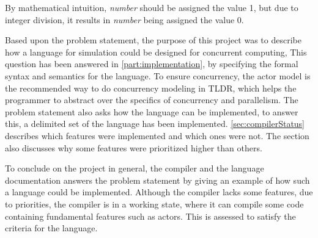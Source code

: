 By mathematical intuition, \emph{number} should be assigned the value 1, but due to integer division, it results in \emph{number} being assigned the value 0.

Based upon the problem statement, the purpose of this project was to describe how a language for simulation could be designed for concurrent computing, This question has been answered in \cref{part:implementation}, by specifying the formal syntax and semantics for the language.
To ensure concurrency, the actor model is the recommended way to do concurrency modeling in TLDR, which helps the programmer to abstract over the specifics of concurrency and parallelism.
The problem statement also asks how the language can be implemented, to answer this, a delimited set of the language has been implemented. \cref{sec:compilerStatus} describes which features were implemented and which ones were not. The section also discusses why some features were prioritized higher than others.

To conclude on the project in general, the compiler and the language documentation answers the problem statement by giving an example of how such a language could be implemented. Although the compiler lacks some features, due to priorities, the compiler is in a working state, where it can compile some code containing fundamental features such as actors. This is assessed to satisfy the criteria for the language.











